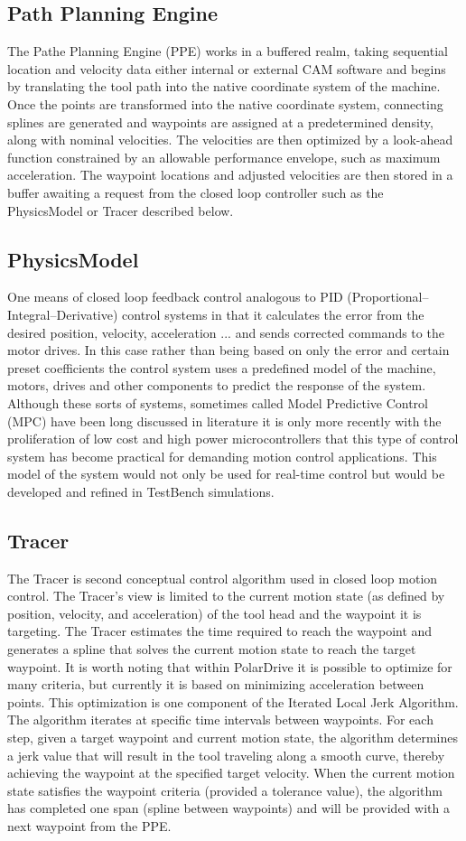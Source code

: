 \documentclass{article}
\begin{document}
\subsection{Path Planning Engine}
The Pathe Planning Engine (PPE) works in a buffered realm, taking sequential location and velocity data either internal or external CAM software and begins by translating the tool path into the native coordinate system of the machine. Once the points are transformed into the native coordinate system, connecting splines are generated and waypoints are assigned at a predetermined density, along with nominal velocities. The velocities are then optimized by a look-ahead function constrained by an allowable performance envelope, such as maximum acceleration. The waypoint locations and adjusted velocities are then stored in a buffer awaiting a request from the closed loop controller such as the PhysicsModel or Tracer described below. 
\subsection{PhysicsModel}
One means of closed loop feedback control analogous to PID (Proportional–Integral–Derivative) control systems in that it calculates the error from the desired position, velocity, acceleration ... and sends corrected commands to the motor drives. In this case rather than being based on only the error and certain preset coefficients the control system uses a predefined model of the machine, motors, drives and other components to predict the response of the system. Although these sorts of systems, sometimes called Model Predictive Control (MPC) have been long discussed in literature it is only more recently with the proliferation of low cost and high power microcontrollers that this type of control system has become practical for demanding motion control applications. This model of the system would not only be used for real-time control but would be developed and refined in TestBench simulations.

\subsection{Tracer} The Tracer is second conceptual control algorithm used in closed loop motion control. The Tracer's view is limited to the current motion state (as defined by position, velocity, and acceleration) of the tool head and the waypoint it is targeting. The Tracer estimates the time required to reach the waypoint and generates a spline that solves the current motion state to reach the target waypoint. It is worth noting that within PolarDrive it is possible to optimize for many criteria, but currently it is based on minimizing acceleration between points. This optimization is one component of the Iterated Local Jerk Algorithm. The algorithm iterates at specific time intervals between waypoints. For each step, given a target waypoint and current motion state, the algorithm determines a jerk value that will result in the tool traveling along a smooth curve, thereby achieving the waypoint at the specified target velocity. When the current motion state satisfies the waypoint criteria (provided a tolerance value), the algorithm has completed one span (spline between waypoints) and will be provided with a next waypoint from the PPE. 
\end{document}
